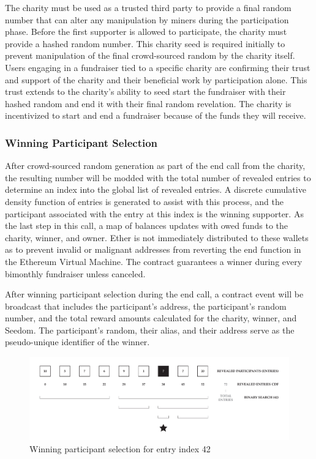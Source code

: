 \documentclass[11pt]{article}
\begin{document}
The charity must be used as a trusted third party to provide a final random number that can alter any manipulation by miners during the participation phase. Before the first supporter is allowed to participate, the charity must provide a hashed random number. This charity seed is required initially to prevent manipulation of the final crowd-sourced random by the charity itself. Users engaging in a fundraiser tied to a specific charity are confirming their trust and support of the charity and their beneficial work by participation alone. This trust extends to the charity's ability to seed start the fundraiser with their hashed random and end it with their final random revelation. The charity is incentivized to start and end a fundraiser because of the funds they will receive.

\subsubsection{Winning Participant Selection}

After crowd-sourced random generation as part of the end call from the charity, the resulting number will be modded with the total number of revealed entries to determine an index into the global list of revealed entries. A discrete cumulative density function of entries is generated to assist with this process, and the participant associated with the entry at this index is the winning supporter. As the last step in this call, a map of balances updates with owed funds to the charity, winner, and owner. Ether is not immediately distributed to these wallets as to prevent invalid or malignant addresses from reverting the end function in the Ethereum Virtual Machine. The contract guarantees a winner during every bimonthly fundraiser unless canceled.

After winning participant selection during the end call, a contract event will be broadcast that includes the participant's address, the participant's random number, and the total reward amounts calculated for the charity, winner, and Seedom. The participant's random, their alias, and their address serve as the pseudo-unique identifier of the winner.

\begin{figure}[H]
\begin{center}
\includegraphics[width=1.0\textwidth]{winningParticipantSelection.pdf}
\caption{Winning participant selection for entry index 42}
\label{figure:winningParticipantSelection}
\end{center}
\end{figure}
\end{document}
